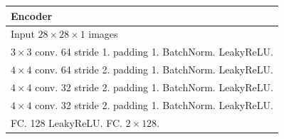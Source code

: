 \begin{table}[!t]
\begin{subtable}[h]{\textwidth}
    \vspace*{1ex}
    \end{subtable}
    \begin{subtable}[h]{\textwidth}
    \centering
        \begin{tabular}{|l|}
        \toprule
        \textbf{Encoder}  \\
        \midrule
        Input $28\times28\times1$ images  \\
        \hline 
        $3\times3$ conv. 64 stride 1. padding 1. BatchNorm. LeakyReLU. \\
        \hline 
        $4\times4$ conv. 64 stride 2. padding 1. BatchNorm. LeakyReLU. \\
        \hline 
        $4\times4$ conv. 32 stride 2. padding 1. BatchNorm. LeakyReLU. \\
        \hline
        $4\times4$ conv. 32  stride 2. padding 1. BatchNorm. LeakyReLU.  \\
        \hline
        FC. 128 LeakyReLU. FC. $2\times128$.  \\
        \bottomrule
        \end{tabular}
    \vspace*{1ex}
    \end{subtable}
    

\end{table}
